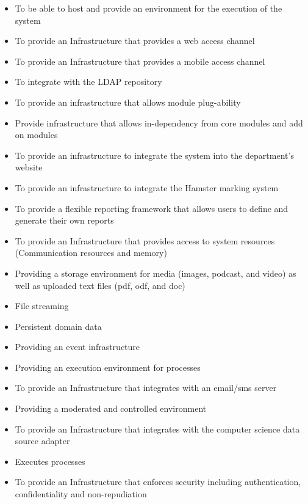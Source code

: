 \documentclass[11pt]{article}
\begin{document}
	\begin{itemize}
	\item To be able to host and provide an environment for the execution of the system
	
	\item To provide an Infrastructure that provides a web access channel
	
	\item To provide an Infrastructure that provides a mobile access channel
	
	\item To integrate with the LDAP repository
	
	\item To provide an infrastructure that allows module plug-ability
	
	\item Provide infrastructure that allows in-dependency from core modules and add on modules
	
	\item To provide an infrastructure to integrate the system into the department's website
	
	\item To provide an infrastructure to integrate the Hamster marking system
	
	\item To provide a flexible reporting framework that allows users to define and generate their own reports
	
	\item To provide an Infrastructure that provides access to system resources (Communication resources and memory)
	
	\item Providing a storage environment for media (images, podcast, and video) as well as uploaded text files (pdf, odf, and doc)
	
	\item File streaming
	
	\item Persistent domain data
	
	\item Providing an event infrastructure
	
	\item Providing an execution environment for processes
	
	\item To provide an Infrastructure that integrates with an email/sms server
	
	\item Providing a moderated and controlled environment
	
	\item To provide an Infrastructure that integrates with the computer science data source adapter
	
	\item Executes processes
	
	\item To provide an Infrastructure that enforces security including authentication, confidentiality and non-repudiation
	\end{itemize}
\end{document}
